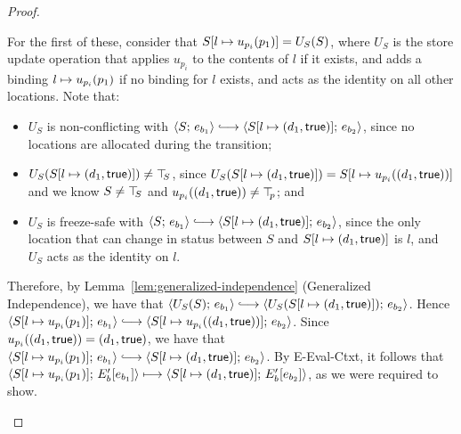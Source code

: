 \begin{proof}
\begin{enumerate}
\begin{enumerate}
\begin{itemize}
\begin{itemize}
              For the first of these, consider that
              $S[l \mapsto u_{p_i}(p_1)] = U_S(S)$, where $U_S$ is
              the store update operation that applies $u_{p_i}$ to the
              contents of $l$ if it exists, and adds a binding
              $l \mapsto u_{p_i}(p_1)$ if no binding for
              $l$ exists, and acts as the identity on all other
              locations.  Note that:
              \begin{itemize}
              \item $U_S$ is non-conflicting with $\config{S}{e_{b_1}}
                \parstepsto
                \config{\extS{S}{l}{d_1}{\frozentrue}}{e_{b_2}}$,
                since no locations are allocated during the
                transition;
              \item $U_S(S[l \mapsto (d_1, \textsf{true})]) \neq \top\hspace{-0.85mm}_{S}$,
                since $U_S(S[l \mapsto (d_1, \textsf{true})]) =
                S[l \mapsto u_{p_i}((d_1, \textsf{true}))]$ and
                we know $S \neq \top\hspace{-0.85mm}_{S}$ and
                $u_{p_i}((d_1, \textsf{true})) \neq \top\hspace{-0.85mm}_{p}$; and
              \item $U_S$ is freeze-safe with $\config{S}{e_{b_1}}
                \parstepsto
                \config{\extS{S}{l}{d_1}{\frozentrue}}{e_{b_2}}$, since
                the only location that can change in status between $S$
                and $S[l \mapsto (d_1, \textsf{true})]$ is $l$, and $U_S$
                acts as the identity on $l$.
              \end{itemize}
              Therefore, by Lemma~\ref{lem:generalized-independence}
              (Generalized Independence), we have that
              $\config{U_S(S)}{e_{b_1}} \parstepsto
              \config{U_S(\extS{S}{l}{d_1}{\frozentrue})}{e_{b_2}}$.
              Hence $\config{\extSRaw{S}{l}{u_{p_i}(p_1)}}{e_{b_1}}
              \parstepsto
              \config{\extSRaw{S}{l}{u_{p_i}(\state{d_1}{\frozentrue})}}{e_{b_2}}$.
              Since $u_{p_i}((d_1, \textsf{true})) =
              (d_1, \textsf{true})$, we have that
              $\config{\extSRaw{S}{l}{u_{p_i}(p_1)}}{e_{b_1}}
              \parstepsto
              \config{\extS{S}{l}{d_1}{\frozentrue}}{e_{b_2}}$.
              By {\sc E-Eval-Ctxt}, it follows that
              $\langle S[l \mapsto u_{p_i}(p_1)];\, E'_b\hspace{-0.5mm}\left[e_{b_1}\right] \rangle
              \longmapsto
              \langle S[l \mapsto (d_1, \textsf{true})];\, E'_b\hspace{-0.5mm}\left[e_{b_2}\right] \rangle$,
              as we were required to show.


\end{itemize}
\end{itemize}
\end{enumerate}
\end{enumerate}
\end{proof}
